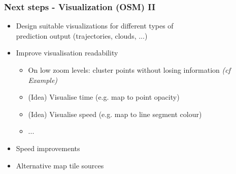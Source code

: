 \documentclass[xcolor=dvipsnames]{beamer}
\begin{document}
\begin{frame}
	\frametitle{Next steps - Visualization (OSM) II}
	\begin{itemize} 
		\item Design suitable visualizations for different types of\\ prediction output (trajectories, clouds, ...)
		\item Improve visualisation readability
		\begin{itemize}
		 	\item On low zoom levels: cluster points without losing information \textit{(cf Example)}
		 	\item (Idea) Visualise time (e.g. map to point opacity)
		 	\item (Idea) Visualise speed (e.g. map to line segment colour)
		 	\item ...
		\end{itemize}
		\item Speed improvements
		\item Alternative map tile sources
	\end{itemize} 
\end{frame}
\end{document}
